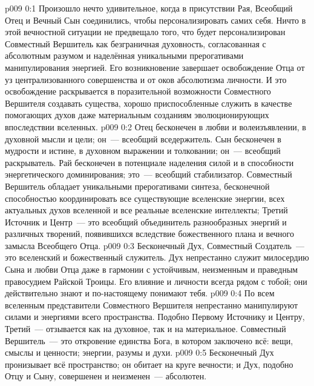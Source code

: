 \author{Божественный Советник}
\vs p009 0:1 Произошло нечто удивительное, когда в присутствии Рая, Всеобщий Отец и Вечный Сын соединились, чтобы персонализировать самих себя. Ничто в этой вечностной ситуации не предвещало того, что будет персонализирован Совместный Вершитель как безграничная духовность, согласованная с абсолютным разумом и наделённая уникальными прерогативами манипулирования энергией. Его возникновение завершает освобождение Отца от уз централизованного совершенства и от оков абсолютизма личности. И это освобождение раскрывается в поразительной возможности Совместного Вершителя создавать существа, хорошо приспособленные служить в качестве помогающих духов даже материальным созданиям эволюционирующих впоследствии вселенных.
\vs p009 0:2 \pc Отец бесконечен в любви и волеизъявлении, в духовной мысли и цели; он~--- всеобщий вседержитель. Сын бесконечен в мудрости и истине, в духовном выражении и толковании; он~--- всеобщий раскрыватель. Рай бесконечен в потенциале наделения силой и в способности энергетического доминирования; это~--- всеобщий стабилизатор. Совместный Вершитель обладает уникальными прерогативами синтеза, бесконечной способностью координировать все существующие вселенские энергии, всех актуальных духов вселенной и все реальные вселенские интеллекты; Третий Источник и Центр~--- это всеобщий объединитель разнообразных энергий и различных творений, появившихся вследствие божественного плана и вечного замысла Всеобщего Отца.
\vs p009 0:3 Бесконечный Дух, Совместный Создатель~--- это вселенский и божественный служитель. Дух непрестанно служит милосердию Сына и любви Отца даже в гармонии с устойчивым, неизменным и праведным правосудием Райской Троицы. Его влияние и личности всегда рядом с тобой; они действительно знают и по\hyp{}настоящему понимают тебя.
\vs p009 0:4 По всем вселенным представители Совместного Вершителя непрестанно манипулируют силами и энергиями всего пространства. Подобно Первому Источнику и Центру, Третий~--- отзывается как на духовное, так и на материальное. Совместный Вершитель~--- это откровение единства Бога, в котором заключено всё: вещи, смыслы и ценности; энергии, разумы и духи.
\vs p009 0:5 \pc Бесконечный Дух пронизывает всё пространство; он обитает на круге вечности; и Дух, подобно Отцу и Сыну, совершенен и неизменен~--- абсолютен.
